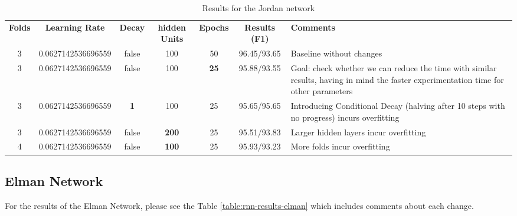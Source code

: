 \documentclass[a4paper]{article}
\begin{document}
\begin{sidewaystable}[]
\centering
\begin{tabular}{ccccccp{8cm}}
\textbf{Folds} & \textbf{Learning Rate} & \textbf{Decay} & \textbf{hidden Units} & \textbf{Epochs} & \textbf{Results (F1)} & \textbf{Comments}                                                                                                                    \\
3              & 0.0627142536696559     & false          & 100                   & 50              & 96.45/93.65           & Baseline without changes                                                                                                             \\
3              & 0.0627142536696559     & false          & 100                   & \textbf{25}     & 95.88/93.55           & Goal: check whether we can reduce the time with similar results, having in mind the faster experimentation time for other parameters \\
3              & 0.0627142536696559     & \textbf{1}     & 100                   & 25              & 95.65/95.65           & Introducing Conditional Decay (halving after 10 steps with no progress) incurs overfitting                                           \\
3              & 0.0627142536696559     & false          & \textbf{200}          & 25              & 95.51/93.83           & Larger hidden layers incur overfitting                                                                                               \\
4              & 0.0627142536696559     & false          & \textbf{100}          & 25              & 95.93/93.23           & More folds incur overfitting                                                                                                        
\end{tabular}
\caption{Results for the Jordan network}
\label{table:rnn-results-jordan}
\end{sidewaystable}


\subsection{Elman Network}
For the results of the Elman Network, please see the Table \ref{table:rnn-results-elman} which includes comments about each change.
\end{document}
